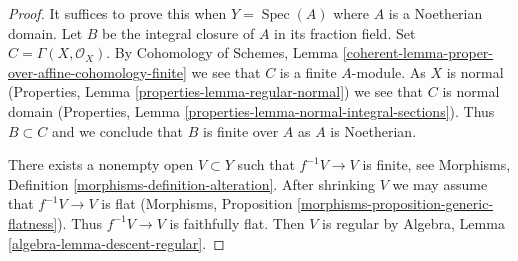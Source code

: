 \documentclass[10pt,a4paper]{amsart}
\theoremstyle{plain}
\theoremstyle{definition}
\theoremstyle{remark}
\numberwithin{equation}{subsection}
\def\Spec{\mathop{\mathrm{Spec}}}
\begin{document}
\begin{proof}
It suffices to prove this when $Y = \Spec(A)$ where $A$ is a Noetherian domain.
Let $B$ be the integral closure of $A$ in its fraction field.
Set $C = \Gamma(X, \mathcal{O}_X)$. By
Cohomology of Schemes, Lemma
\ref{coherent-lemma-proper-over-affine-cohomology-finite}
we see that $C$ is a finite $A$-module. As $X$ is normal
(Properties, Lemma \ref{properties-lemma-regular-normal})
we see that $C$ is normal domain
(Properties, Lemma \ref{properties-lemma-normal-integral-sections}).
Thus $B \subset C$ and we conclude that $B$ is finite over $A$
as $A$ is Noetherian.

\medskip\noindent
There exists a nonempty open $V \subset Y$ such that $f^{-1}V \to V$
is finite, see Morphisms, Definition \ref{morphisms-definition-alteration}.
After shrinking $V$ we may assume that $f^{-1}V \to V$ is flat
(Morphisms, Proposition \ref{morphisms-proposition-generic-flatness}).
Thus $f^{-1}V \to V$ is faithfully flat. Then $V$ is regular by
Algebra, Lemma \ref{algebra-lemma-descent-regular}.
\end{proof}
\end{document}
